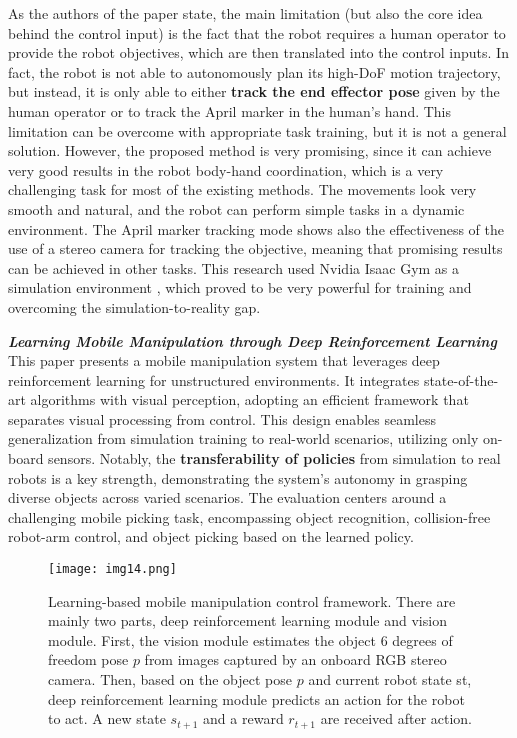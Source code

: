 As the authors of the paper \cite{fu2022deeplegged} state, the main limitation (but also the core idea
behind the control input) is the fact that the robot requires a human operator to
provide the robot objectives, which are then translated into the control inputs. In fact,
the robot is not able to autonomously plan its high-DoF motion trajectory, but instead,
it is only able to either \textbf{track the end effector pose} given by the human operator or
to track the April marker in the human's hand.
This limitation can be overcome with appropriate task training, but it is not a general solution.
However, the proposed method is very promising, since it can achieve very good results
in the robot body-hand coordination, which is a very challenging task for most of the existing
methods. The movements look very smooth and natural, and the robot can perform
simple tasks in a dynamic environment. The April marker tracking mode shows also the effectiveness of
the use of a stereo camera for tracking the objective, meaning that promising results can be
achieved in other tasks. This research used Nvidia Isaac Gym \cite{isaacgym} as a simulation environment
\cite{isaacsim}, which proved to be very powerful for training and overcoming the simulation-to-reality gap.

\textbf{\textit{Learning Mobile Manipulation through Deep
		Reinforcement Learning}} \quad
\cite{wang2020drlmanipulation}
This paper presents a mobile manipulation system that leverages deep
reinforcement learning for unstructured environments. It integrates state-of-the-art
algorithms with visual perception, adopting an efficient framework that separates
visual processing from control. This design enables seamless generalization from simulation
training to real-world scenarios, utilizing only on-board sensors.
Notably, the \textbf{transferability of policies} from simulation to real robots is a key strength,
demonstrating the system's autonomy in grasping diverse objects across varied scenarios.
The evaluation centers around a challenging mobile picking task, encompassing object recognition,
collision-free robot-arm control, and object picking based on the learned policy.


\begin{figure}[ht]
	\centering
	\texttt{[image: img14.png]}
	\captionsetup{width=1\linewidth}
	\caption{Learning-based mobile manipulation control framework. There are mainly two parts,
		deep reinforcement learning module and vision module. First, the vision module estimates
		the object 6 degrees of freedom pose $p$ from images captured by an onboard RGB stereo camera.
		Then, based on the object pose $p$ and current robot state st, deep reinforcement learning
		module predicts an action for the robot to act. A new state $s_{t+1}$ and a reward
		$r_{t+1}$ are received after action.\cite{wang2020drlmanipulation}}
	\label{fig:img14}
\end{figure}

